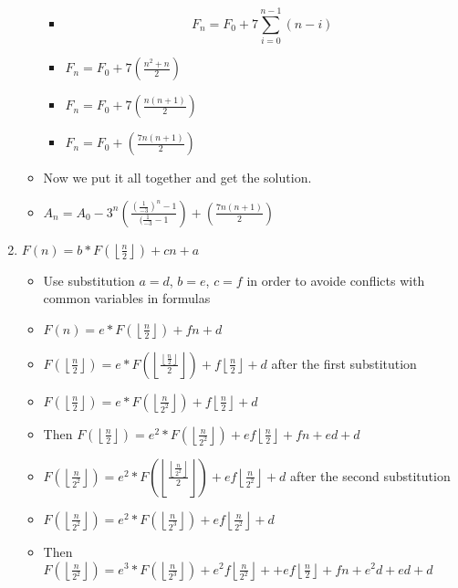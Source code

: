 \begin{enumerate}
\begin{itemize}
\begin{itemize}
    \item $$F_{n}=F_{0} + 7\sum\limits_{i=0}^{n-1}(n-i)$$
    \item $F_{n}=F_{0} + 7\left(\frac{n^{2}+n}{2}\right)$
    \item $F_{n}=F_{0} + 7\left(\frac{n\left(n+1\right)}{2}\right)$
    \item $F_{n}=F_{0} + \left(\frac{7n\left(n+1\right)}{2}\right)$
    \end{itemize}
  \item Now we put it all together and get the solution.
  \item $A_{n}=A_{0}-3^{n}\left(\frac{(\frac{1}{-3})^{n}-1}{(\frac{1}{-3}-1}\right)+\left(\frac{7n\left(n+1\right)}{2}\right)$
  \end{itemize} 
\item $F(n)=b*F\left(\left\lfloor\frac{n}{2}\right\rfloor\right)+cn+a$
  \begin{itemize}
  \item Use substitution $a=d$, $b=e$, $c=f$ in order to avoide conflicts with common variables in formulas
  \item $F(n)=e*F\left(\left\lfloor\frac{n}{2}\right\rfloor\right)+fn+d$
  \item $F\left(\left\lfloor\frac{n}{2}\right\rfloor\right)=e*F\left(\left\lfloor\frac{\left\lfloor\frac{n}{2}\right\rfloor}{2}\right\rfloor\right)+f\left\lfloor\frac{n}{2}\right\rfloor+d$ after the first substitution
  \item $F\left(\left\lfloor\frac{n}{2}\right\rfloor\right)=e*F\left(\left\lfloor\frac{n}{2^{2}}\right\rfloor\right)+f\left\lfloor\frac{n}{2}\right\rfloor+d$
  \item Then $F\left(\left\lfloor\frac{n}{2}\right\rfloor\right)=e^{2}*F\left(\left\lfloor\frac{n}{2^{2}}\right\rfloor\right)+ef\left\lfloor\frac{n}{2}\right\rfloor+fn+ed+d$
  \item $F\left(\left\lfloor\frac{n}{2^{2}}\right\rfloor\right)=e^{2}*F\left(\left\lfloor\frac{\left\lfloor\frac{n}{2^{2}}\right\rfloor}{2}\right\rfloor\right)+ef\left\lfloor\frac{n}{2^{2}}\right\rfloor+d$ after the second substitution
  \item $F\left(\left\lfloor\frac{n}{2^{2}}\right\rfloor\right)=e^{2}*F\left(\left\lfloor\frac{n}{2^{3}}\right\rfloor\right)+ef\left\lfloor\frac{n}{2^{2}}\right\rfloor+d$
  \item Then $F\left(\left\lfloor\frac{n}{2^{2}}\right\rfloor\right)=e^{3}*F\left(\left\lfloor\frac{n}{2^{3}}\right\rfloor\right)+e^{2}f\left\lfloor\frac{n}{2^{2}}\right\rfloor++ef\left\lfloor\frac{n}{2}\right\rfloor+fn+e^{2}d+ed+d$

\end{itemize}
\end{enumerate}

